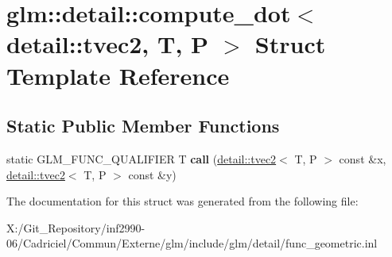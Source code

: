 \hypertarget{structglm_1_1detail_1_1compute__dot_3_01detail_1_1tvec2_00_01_t_00_01_p_01_4}{\section{glm\-:\-:detail\-:\-:compute\-\_\-dot$<$ detail\-:\-:tvec2, T, P $>$ Struct Template Reference}
\label{structglm_1_1detail_1_1compute__dot_3_01detail_1_1tvec2_00_01_t_00_01_p_01_4}
}
\subsection*{Static Public Member Functions}
\begin{DoxyCompactItemize}
\item 
\hypertarget{structglm_1_1detail_1_1compute__dot_3_01detail_1_1tvec2_00_01_t_00_01_p_01_4_a5ab1761eaa0efc9ecb4f62171d2a6dd2}{static G\-L\-M\-\_\-\-F\-U\-N\-C\-\_\-\-Q\-U\-A\-L\-I\-F\-I\-E\-R T {\bfseries call} (\hyperlink{structglm_1_1detail_1_1tvec2}{detail\-::tvec2}$<$ T, P $>$ const \&x, \hyperlink{structglm_1_1detail_1_1tvec2}{detail\-::tvec2}$<$ T, P $>$ const \&y)}\label{structglm_1_1detail_1_1compute__dot_3_01detail_1_1tvec2_00_01_t_00_01_p_01_4_a5ab1761eaa0efc9ecb4f62171d2a6dd2}

\end{DoxyCompactItemize}


The documentation for this struct was generated from the following file\-:\begin{DoxyCompactItemize}
\item 
X\-:/\-Git\-\_\-\-Repository/inf2990-\/06/\-Cadriciel/\-Commun/\-Externe/glm/include/glm/detail/func\-\_\-geometric.\-inl\end{DoxyCompactItemize}

